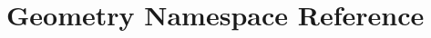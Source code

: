\hypertarget{namespace_geometry}{}\section{Geometry Namespace Reference}
\label{namespace_geometry}
